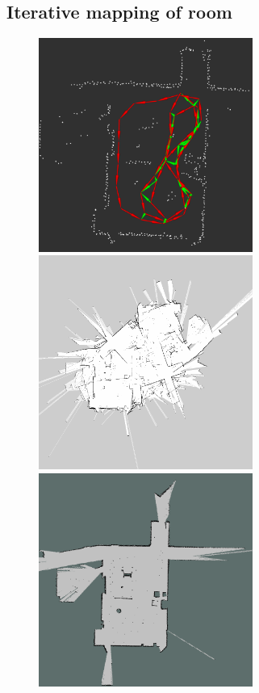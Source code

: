 \subsection{Iterative mapping of room}
\begin{figure}
	\centering
	\includegraphics[width=70mm]{../img/room_ndt.png}
		\vspace{0.1cm}
	\includegraphics[width=70mm]{../img/room_hector.png}
	\includegraphics[width=70mm]{../img/room_gmapping.png}
	

\end{figure}
